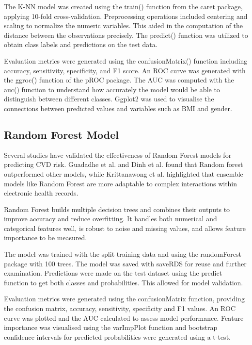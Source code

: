 \documentclass[conference]{IEEEtran}
\begin{document}
The K-NN model was created using the train() function from the caret package, applying 10-fold cross-validation. Preprocessing operations included centering and scaling to normalize the numeric variables. This aided in the computation of the distance between the observations precisely. The predict() function was utilized to obtain class labels and predictions on the test data.

Evaluation metrics were generated using the confusionMatrix() function including accuracy, sensitivity, specificity, and F1 score. An ROC curve was generated with the ggroc() function of the pROC package. The AUC was computed with the auc() function to understand how accurately the model would be able to distinguish between different classes. Ggplot2 was used to visualise the connections between predicted values and variables such as BMI and gender.


\subsection{Random Forest Model}
Several studies have validated the effectiveness of Random Forest models for predicting CVD risk. Guadadhe et al. \cite{RF1} and Dinh et al. \cite{RF2} found that Random forest outperformed other models, while Krittanawong et al. \cite{RF3} highlighted that ensemble models like Random Forest are more adaptable to complex interactions within electronic health records. 

Random Forest builds multiple decision trees and combines their outputs to improve accuracy and reduce overfitting. It handles both numerical and categorical features well, is robust to noise and missing values, and allows feature importance to be measured.

The model was trained with the split training data and using the randomForest package with 100 trees. The model was saved with saveRDS for reuse and further examination. Predictions were made on the test dataset using the predict function to get both classes and probabilities. This allowed for model validation.

Evaluation metrics were generated using the confusionMatrix function, providing the confusion matrix, accuracy, sensitivity, specificity and F1 values. An ROC curve was plotted and the AUC calculated to assess model performance. Feature importance was visualised using the varImpPlot function and bootstrap confidence intervals for predicted probabilities were generated using a t-test.
\end{document}
